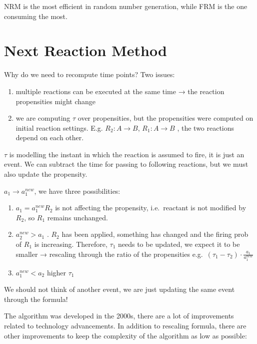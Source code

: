 NRM is the most efficient in random number generation, while FRM is the
one consuming the most.

\hypertarget{next-reaction-method}{%
\section{Next Reaction Method}\label{next-reaction-method}}

Why do we need to recompute time points? Two issues:

\begin{enumerate}
\def\labelenumi{\arabic{enumi}.}
\tightlist
\item
  multiple reactions can be executed at the same time → the reaction
  propensities might change
\item
  we are computing $\tau$ over propensities, but the propensities were
  computed on initial reaction settings. E.g. $R_2:A \rightarrow B$,
  $R_1 : A \rightarrow B$ , the two reactions depend on each other.
\end{enumerate}

$\tau$ is modelling the instant in which the reaction is assumed to
fire, it is just an event. We can subtract the time for passing to
following reactions, but we must also update the propensity.

$a_1 \rightarrow a_1^{new}$, we have three possibilities:

\begin{enumerate}
\def\labelenumi{\arabic{enumi}.}
\tightlist
\item
  $a_1 = a_1^{new}$$R_2$ is not affecting the propensity, i.e.~reactant
  is not modified by $R_2$, so $R_1$ remains unchanged.
\item
  $a_2^{new} > a_1$ . $R_2$ has been applied, something has changed and
  the firing prob of $R_1$ is increasing. Therefore, $\tau_1$ needs to
  be updated, we expect it to be smaller → rescaling through the ratio
  of the propensities e.g.~$(\tau_1-\tau_2) \cdot \frac{a_1}{a_1^{new}}$
\item
  $a_1^{new} < a_2$ higher $\tau_1$
\end{enumerate}

We should not think of another event, we are just updating the same
event through the formula!

The algorithm was developed in the 2000s, there are a lot of
improvements related to technology advancements. In addition to
rescaling formula, there are other improvements to keep the complexity
of the algorithm as low as possible:

